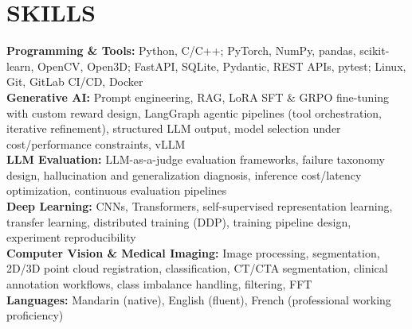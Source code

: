 \documentclass[a4paper,12pt]{article}
\let\oldsection\section
\renewcommand{\section}[1]{\needspace{5\baselineskip}\oldsection{#1}}
\begin{document}
\section{SKILLS}
 \begin{itemize}[leftmargin=0.2in, label={}]
    \small{\item{
    \textbf{Programming \& Tools:} Python, C/C++; PyTorch, NumPy, pandas, scikit-learn, OpenCV, Open3D; FastAPI, SQLite, Pydantic, REST APIs, pytest; Linux, Git, GitLab CI/CD, Docker\\
    \textbf{Generative AI:} Prompt engineering, RAG, LoRA SFT \& GRPO fine-tuning with custom reward design, LangGraph agentic pipelines (tool orchestration, iterative refinement), structured LLM output, model selection under cost/performance constraints, vLLM\\
    \textbf{LLM Evaluation:} LLM-as-a-judge evaluation frameworks, failure taxonomy design, hallucination and generalization diagnosis, inference cost/latency optimization, continuous evaluation pipelines\\
    \textbf{Deep Learning:} CNNs, Transformers, self-supervised representation learning, transfer learning, distributed training (DDP), training pipeline design, experiment reproducibility\\
    \textbf{Computer Vision \& Medical Imaging:} Image processing, segmentation, 2D/3D point cloud registration, classification, CT/CTA segmentation, clinical annotation workflows, class imbalance handling, filtering, FFT\\
    \textbf{Languages:} Mandarin (native), English (fluent), French (professional working proficiency)
    }}
 \end{itemize}
\end{document}
